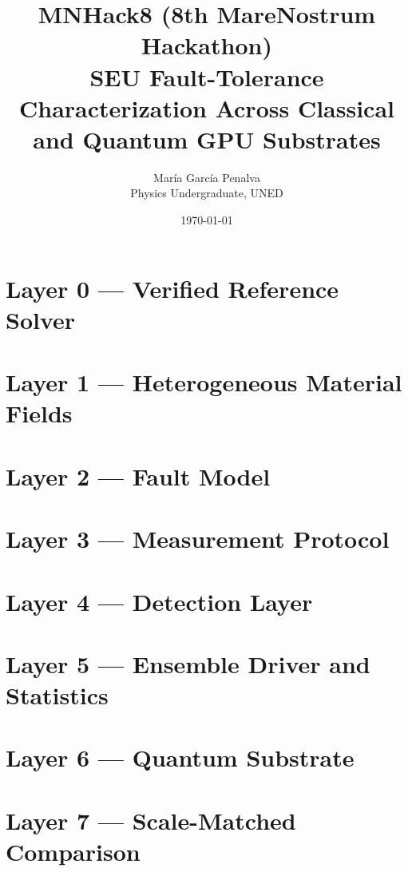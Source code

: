 \documentclass[11pt]{report}
\title{MNHack8 (8th MareNostrum Hackathon) \\[4pt]
\large SEU Fault-Tolerance Characterization Across Classical and Quantum GPU Substrates}
\author{Mar\'ia Garc\'ia Penalva \\ Physics Undergraduate, UNED \\ }
\date{\today}
\begin{document}
\maketitle
\tableofcontents
\listoffigures
\listoftables

%


\chapter{Layer 0 --- Verified Reference Solver}
\label{ch:layer0}


\chapter{Layer 1 --- Heterogeneous Material Fields}
\label{ch:layer1}


\chapter{Layer 2 --- Fault Model}
\label{ch:layer2}


\chapter{Layer 3 --- Measurement Protocol}
\label{ch:layer3}


\chapter{Layer 4 --- Detection Layer}
\label{ch:layer4}


\chapter{Layer 5 --- Ensemble Driver and Statistics}
\label{ch:layer5}


\chapter{Layer 6 --- Quantum Substrate}
\label{ch:layer6}


\chapter{Layer 7 --- Scale-Matched Comparison}
\label{ch:layer7}

\end{document}
